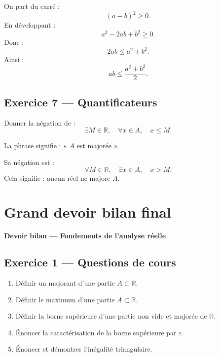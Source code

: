 \documentclass[11pt,a4paper]{article}
\newcommand{\R}{\mathbb R}
\begin{document}
\begin{correctionbox}
On part du carré :
\[
(a-b)^2\geq0.
\]
En développant :
\[
a^2-2ab+b^2\geq0.
\]
Donc :
\[
2ab\leq a^2+b^2.
\]
Ainsi :
\[
ab\leq\frac{a^2+b^2}{2}.
\]
\end{correctionbox}

\subsection*{Exercice 7 — Quantificateurs}

\begin{exercicebox}
Donner la négation de :
\[
\exists M\in\R,\quad \forall x\in A,\quad x\leq M.
\]
\end{exercicebox}

\begin{correctionbox}
La phrase signifie : « \(A\) est majorée ».

Sa négation est :
\[
\forall M\in\R,\quad \exists x\in A,\quad x>M.
\]
Cela signifie : aucun réel ne majore \(A\).
\end{correctionbox}

\newpage
\section{Grand devoir bilan final}

\begin{center}
\Large\textbf{Devoir bilan — Fondements de l'analyse réelle}
\end{center}

\subsection*{Exercice 1 — Questions de cours}

\begin{enumerate}
    \item Définir un majorant d'une partie \(A\subset\R\).
    \item Définir le maximum d'une partie \(A\subset\R\).
    \item Définir la borne supérieure d'une partie non vide et majorée de \(\R\).
    \item Énoncer la caractérisation de la borne supérieure par \(\varepsilon\).
    \item Énoncer et démontrer l'inégalité triangulaire.
\end{enumerate}
\end{document}
